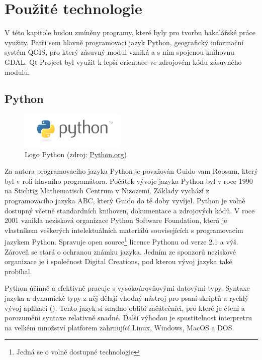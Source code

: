 \chapter{Použité technologie}
\label{3-technologie}
V této kapitole budou zmíněny programy, které byly pro tvorbu bakalářské práce využity. Patří sem hlavně programovací jazyk Python, geografický informační systém QGIS, pro který zásuvný modul vzniká a s ním spojenou knihovnu GDAL. Qt Project byl využit k lepší orientace ve zdrojovém kódu zásuvného modulu.

\section{Python}
\label{sec:python}
\begin{figure}[H]
	 \centering
      \includegraphics[width=5cm]{./pictures/python-logo.png}
      \caption{Logo Python (zdroj:
\href{https://www.python.org/static/community_logos/python-logo-master-v3-TM.png}{Python.org})}
      \label{fig:python}
  \end{figure}
  
Za autora programovacího jazyka Python je považován Guido vam Roosum, který byl v roli hlavního programátora. Počátek vývoje jazyka Python byl v roce 1990 na Stichtig Mathematisch Centrum v Nizozemí. Základy vychází z programovacího jazyka ABC, který Guido do té doby vyvíjel. Python je volně dostupný včetně standardních knihoven, dokumentace a zdrojových kódů. V roce 2001 vznikla nezisková organizace Python Software Foundation, která je vlastníkem veškerých intelektuálních materiálů souvisejících s programovacím jazykem Python. Spravuje open source\footnote{Jedná se o volně dostupné technologie} licence Pythonu od verze 2.1 a výš. Zároveň se stará o ochranou známku jazyka. Jedním ze sponzorů neziskové organizace je i společnost Digital Creations, pod kterou vývoj jazyka také probíhal.

Python účinně a efektivně pracuje s vysokoúrovňovými datovými typy. Syntaxe jazyka a dynamické typy z něj dělají vhodný nástroj pro psaní skriptů a rychlý vývoj aplikací (). Tento jazyk si snadno oblíbí začátečníci, pro které je čtení a porozumění syntaxe relativně snadné. Další výhodou je spustitelnost interpretru na velkém množství platforem zahrnující Linux, Windows, MacOS a DOS. \cite{ucebnicepython, python}

